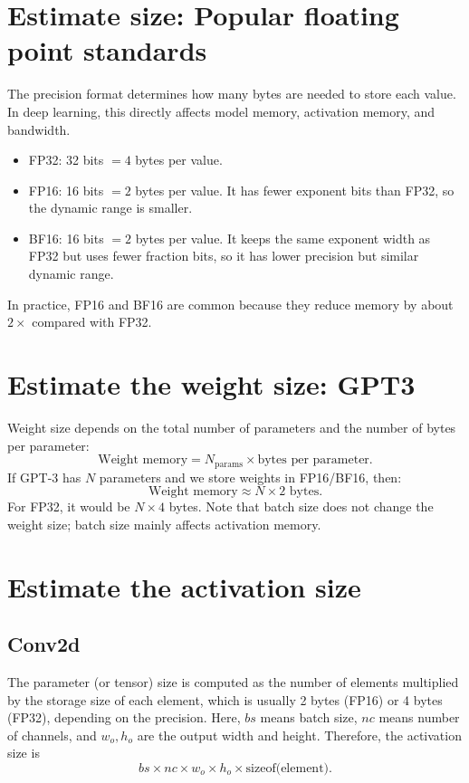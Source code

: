 
\section{Estimate size: Popular floating point standards}
The precision format determines how many bytes are needed to store each value.
In deep learning, this directly affects model memory, activation memory, and bandwidth.
\begin{itemize}
    \item FP32: 32 bits $= 4$ bytes per value.
    \item FP16: 16 bits $= 2$ bytes per value. It has fewer exponent bits than FP32, so the dynamic range is smaller.
    \item BF16: 16 bits $= 2$ bytes per value. It keeps the same exponent width as FP32 but uses fewer fraction bits, so it has lower precision but similar dynamic range.
\end{itemize}
In practice, FP16 and BF16 are common because they reduce memory by about $2\times$ compared with FP32.
\section{Estimate the weight size: GPT3}
Weight size depends on the total number of parameters and the number of bytes per parameter:
\[
\text{Weight memory} = N_{\text{params}} \times \text{bytes per parameter}.
\]
If GPT-3 has $N$ parameters and we store weights in FP16/BF16, then:
\[
\text{Weight memory} \approx N \times 2 \text{ bytes}.
\]
For FP32, it would be $N \times 4$ bytes.
Note that batch size does not change the weight size; batch size mainly affects activation memory.
\section{Estimate the activation size}
\subsection{Conv2d}
The parameter (or tensor) size is computed as the number of elements multiplied by the storage size of each element, which is usually 2 bytes (FP16) or 4 bytes (FP32), depending on the precision. Here, $bs$ means batch size, $nc$ means number of channels, and $w_o, h_o$ are the output width and height. Therefore, the activation size is
\[
bs \times nc \times w_o \times h_o \times \text{sizeof(element)}.
\]